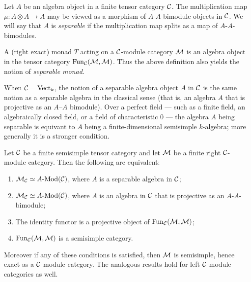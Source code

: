 \documentclass{amsart}
\begin{document}
\begin{definition}
	Let $A$ be an algebra object in a finite tensor category $\mathcal C$. The multiplication map $\mu: A \otimes A \to A$ may be viewed as a morphism of $A$-$A$-bimodule objects in $\mathcal C$. We will say that $A$ is {\em separable} if the multiplication map splits as a map of $A$-$A$-bimodules. 
\end{definition}

\begin{remark}
	A (right exact) monad $T$ acting on a $\mathcal C$-module category $\mathcal M$ is an algebra object in the tensor category $\operatorname{Fun}_\mathcal C(\mathcal M, \mathcal M)$. Thus the above definition also yields the notion of {\em separable monad}. 
\end{remark}

\begin{remark}
	When $\mathcal C = \mathrm{Vect}_k$, the notion of a separable algebra object $A$ in $\mathcal C$ is the same notion as a separable algebra in the classical sense (that is, an algebra $A$ that is projective as an $A$--$A$ bimodule). Over a perfect field --- such as a finite field, an algebraically closed field, or a field of characteristic $0$ --- the algebra $A$ being separable is equivant to $A$ being a finite-dimensional semisimple $k$-algebra; more generally it is a stronger condition. 
\end{remark}

\begin{theorem} \label{thm:SepModCats}
	Let $\mathcal C$ be a finite semisimple tensor category and let $\mathcal M$ be a finite right $\mathcal C$-module category. Then the following are equivalent:
	\begin{enumerate}
		\item $\cM_\cC \simeq \Mod{A}{}(\cC)$, where $A$ is a separable algebra in $\mathcal C$;
		\item $\cM_\cC \simeq \Mod{A}{}(\cC)$, where $A$ is an algebra in $\mathcal C$ that is projective as an $A$-$A$-bimodule;
		\item The identity functor is a projective object of $\operatorname{Fun}_\mathcal C(\mathcal M, \mathcal M)$;
		\item $\operatorname{Fun}_\mathcal C(\mathcal M, \mathcal M)$ is a semisimple category. 
	\end{enumerate}
	Moreover if any of these conditions is satisfied, then $\mathcal M$ is semisimple, hence exact as a $\mathcal C$-module category. The analogous results hold for left $\mathcal C$-module categories as well. 
\end{theorem}
\end{document}
